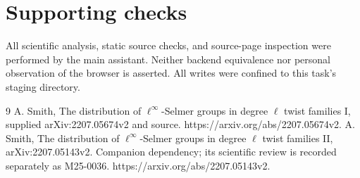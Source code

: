 \documentclass[10pt]{article}
\begin{document}
\section*{Supporting checks}
All scientific analysis, static source checks, and source-page inspection were performed by the main assistant. Neither backend equivalence nor personal observation of the browser is asserted. All writes were confined to this task’s staging directory.\par
9 A. Smith, The distribution of \(\ell^\infty\)-Selmer groups in degree \(\ell\) twist families I, supplied arXiv:2207.05674v2 and source. https://arxiv.org/abs/2207.05674v2. A. Smith, The distribution of \(\ell^\infty\)-Selmer groups in degree \(\ell\) twist families II, arXiv:2207.05143v2. Companion dependency; its scientific review is recorded separately as M25-0036. https://arxiv.org/abs/2207.05143v2.\par
\end{document}
